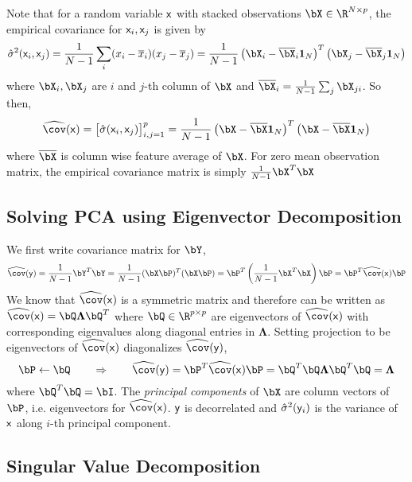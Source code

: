 \documentclass[11pt]{article}
\begin{document}
Note that for a random variable $\mathsf{x}$ with stacked observations $\bX\in\R^{N\times p}$, the empirical covariance for $\mathsf{x}_i,\mathsf{x}_j$ is given by 
\[
    \hat{\sigma}^2(\rx_i,\rx_j)
    = \frac{1}{N-1} \sum_i (x_i-\overline{x}_i)(x_j-\overline{x}_j) 
    = \frac{1}{N-1} \left( \bX_i - \overline{\bX}_i \mathbf{1}_N \right)^T \left( \bX_j - \overline{\bX}_j \mathbf{1}_N \right)
\]
where $\bX_i,\bX_j$ are $i$ and $j$-th column of $\bX$ and $\overline{\bX}_i = \frac{1}{N-1} \sum_j \bX_{ji}$. So then,
\[
    \widehat{\cov}(\rx) 
    = \begin{bmatrix}
        \hat{\sigma}(\rx_i,\rx_j)
    \end{bmatrix}_{i,j=1}^p
    = \frac{1}{N-1} \left( \bX - \overline{\bX} \mathbf{1}_N \right)^T \left( \bX - \overline{\bX} \mathbf{1}_N \right)
\]
where $\overline{\bX}$ is column wise feature average of $\bX$. For zero mean observation matrix, the empirical covariance matrix is simply $\frac{1}{N-1} \bX^T \bX$

\subsection{Solving PCA using Eigenvector Decomposition}

We first write covariance matrix for $\bY$,
\[
    \widehat{\cov}(\ry)
    = \frac{1}{N-1} \bY^T \bY
    = \frac{1}{N-1} (\bX\bP)^T (\bX\bP)
    = \bP^T \left( \frac{1}{N-1} \bX^T\bX \right) \bP
    = \bP^T \widehat{\cov}(\rx) \bP
\]
We know that $\widehat{\cov}(\rx)$ is a symmetric matrix and therefore can be written as $\widehat{\cov}(\rx) = \bQ \boldsymbol{\Lambda} \bQ^T$ where $\bQ \in \R^{p\times p}$ are eigenvectors of $\widehat{\cov}(\rx)$ with corresponding eigenvalues along diagonal entries in $\boldsymbol{\Lambda}$. Setting projection to be eigenvectors of $\widehat{\cov}(\rx)$ diagonalizes $\widehat{\cov}(\ry)$,
\[
    \bP \leftarrow \bQ
    \quad\quad \Rightarrow \quad\quad
    \widehat{\cov}(\ry)
    = \bP^T \widehat{\cov}(\rx) \bP
    = \bQ^T \bQ \boldsymbol{\Lambda} \bQ^T \bQ
    = \boldsymbol{\Lambda} 
\]
where $\bQ^T\bQ = \bI$. The \textit{principal components} of $\bX$ are column vectors of $\bP$, i.e. eigenvectors for $\widehat{\cov}(\rx)$. $\mathsf{y}$ is decorrelated and $\hat{\sigma}^2(\mathsf{y}_i)$ is the variance of $\mathsf{x}$ along $i$-th principal component.

\subsection{Singular Value Decomposition}
\end{document}
